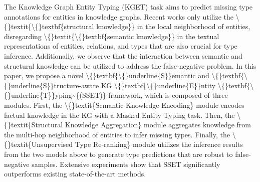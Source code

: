 The Knowledge Graph Entity Typing (KGET) task aims to predict missing type annotations for entities in knowledge graphs. Recent works only utilize the \textbackslash\{\}textit\{\textbackslash\{\}textbf\{structural knowledge\}\} in the local neighborhood of entities, disregarding \textbackslash\{\}textit\{\textbackslash\{\}textbf\{semantic knowledge\}\} in the textual representations of entities, relations, and types that are also crucial for type inference. Additionally, we observe that the interaction between semantic and structural knowledge can be utilized to address the false-negative problem. In this paper, we propose a novel \textbackslash\{\}textbf\{\textbackslash\{\}underline\{S\}\}emantic and \textbackslash\{\}textbf\{\textbackslash\{\}underline\{S\}\}tructure-aware KG \textbackslash\{\}textbf\{\textbackslash\{\}underline\{E\}\}ntity \textbackslash\{\}textbf\{\textbackslash\{\}underline\{T\}\}yping\textasciitilde{}\{(SSET)\} framework, which is composed of three modules. First, the \textbackslash\{\}textit\{Semantic Knowledge Encoding\} module encodes factual knowledge in the KG with a Masked Entity Typing task. Then, the \textbackslash\{\}textit\{Structural Knowledge Aggregation\} module aggregates knowledge from the multi-hop neighborhood of entities to infer missing types. Finally, the \textbackslash\{\}textit\{Unsupervised Type Re-ranking\} module utilizes the inference results from the two models above to generate type predictions that are robust to false-negative samples. Extensive experiments show that SSET significantly outperforms existing state-of-the-art methods.